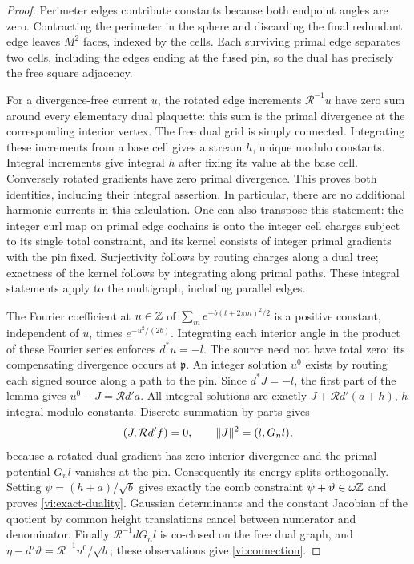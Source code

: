 \begin{proof}
Perimeter edges contribute constants because both endpoint angles are
zero.  Contracting the perimeter in the sphere and discarding the final
redundant edge leaves $M^2$ faces, indexed by the cells.  Each surviving
primal edge separates two cells, including the edges ending at the fused
pin, so the dual has precisely the free square adjacency.

For a divergence-free current $u$, the rotated edge increments
$\mathcal R^{-1}u$ have zero sum around every elementary dual plaquette:
this sum is the primal divergence at the corresponding interior vertex.
The free dual grid is simply connected.  Integrating these increments
from a base cell gives a stream $h$, unique modulo constants.  Integral
increments give integral $h$ after fixing its value at the base cell.
Conversely rotated gradients have zero primal divergence.  This proves
both identities, including their integral assertion.  In particular,
there are no additional harmonic currents in this calculation.  One can
also transpose this statement: the integer curl map on primal edge
cochains is onto the integer cell charges subject to its single total
constraint, and its kernel consists of integer primal gradients with the
pin fixed.  Surjectivity follows by routing charges along a dual tree;
exactness of the kernel follows by integrating along primal paths.  These
integral statements apply to the multigraph, including parallel edges.

The Fourier coefficient at $u\in\mathbb Z$ of
$\sum_m e^{-b(t+2\pi m)^2/2}$ is a positive constant, independent of $u$,
times $e^{-u^2/(2b)}$.  Integrating each interior angle in the product of
these Fourier series enforces $d^*u=-l$.  The source need not have total
zero: its compensating divergence occurs at $\mathfrak p$.  An integer
solution $u^0$ exists by routing each signed source along a path to the
pin.  Since $d^*J=-l$, the first part of the lemma gives
$u^0-J=\mathcal R d'a$.  All integral solutions are exactly
$J+\mathcal R d'(a+h)$, $h$ integral modulo constants.  Discrete summation
by parts gives
\[
 (J,\mathcal R d'f)=0,\qquad
 \lVert J\rVert^2=(l,G_nl),
\]
because a rotated dual gradient has zero interior divergence and the
primal potential $G_nl$ vanishes at the pin.  Consequently its energy
splits orthogonally.  Setting $\psi=(h+a)/\sqrt b$ gives exactly the comb
constraint $\psi+\vartheta\in\omega\mathbb Z$ and proves
\eqref{vi:exact-duality}.  Gaussian determinants and the constant Jacobian
of the quotient by common height translations cancel between numerator
and denominator.  Finally $\mathcal R^{-1}dG_nl$ is co-closed on the free
dual graph, and
$\eta-d'\vartheta=\mathcal R^{-1}u^0/\sqrt b$; these observations give
\eqref{vi:connection}.
\end{proof}

